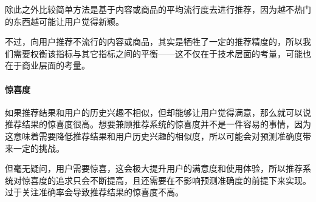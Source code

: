 除此之外比较简单方法是基于内容或商品的平均流行度去进行推荐，因为越不热门的东西越可能让用户觉得新颖。

不过，向用户推荐不流行的内容或商品，其实是牺牲了一定的推荐精度的，所以我们需要权衡该指标与其它指标之间的平衡——这不仅在于技术层面的考量，可能也在于商业层面的考量。

\paragraph{惊喜度}如果推荐结果和用户的历史兴趣不相似，但却能够让用户觉得满意，那么就可以说推荐结果的惊喜度很高。想要兼顾推荐系统的惊喜度并不是一件容易的事情，因为这意味着需要降低推荐结果和用户历史兴趣的相似度，所以可能会对预测准确度带来一定的挑战。

但毫无疑问，用户需要惊喜，这会极大提升用户的满意度和使用体验，所以推荐系统对惊喜度的追求只会不断提高，且还需要在不影响预测准确度的前提下来实现。过于关注准确率会导致推荐结果的惊喜度不高。


